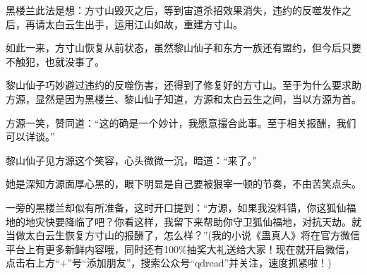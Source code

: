 \begin{this_body}
黑楼兰此法是想：方寸山毁灭之后，等到宙道杀招效果消失，违约的反噬发作之后，再请太白云生出手，运用江山如故，重建方寸山。

如此一来，方寸山恢复从前状态，虽然黎山仙子和东方一族还有盟约，但今后只要不触犯，也就没事了。

黎山仙子巧妙避过违约的反噬伤害，还得到了修复好的方寸山。至于为什么要求助方源，显然是因为黑楼兰、黎山仙子知道，方源和太白云生之间，当以方源为首。

方源一笑，赞同道：“这的确是一个妙计，我愿意撮合此事。至于相关报酬，我们可以详谈。”

黎山仙子见方源这个笑容，心头微微一沉，暗道：“来了。”

她是深知方源面厚心黑的，眼下明显是自己要被狠宰一顿的节奏，不由苦笑点头。

一旁的黑楼兰却似有所准备，这时开口提到：“方源，如果我没料错，你这狐仙福地的地灾快要降临了吧？你看这样，我留下来帮助你守卫狐仙福地，对抗天劫。就当做太白云生恢复方寸山的报酬了，怎么样？”(我的小说《蛊真人》将在官方微信平台上有更多新鲜内容哦，同时还有100\%抽奖大礼送给大家！现在就开启微信，点击右上方“+”号“添加朋友”，搜索公众号“qdread”并关注，速度抓紧啦！)

\end{this_body}

